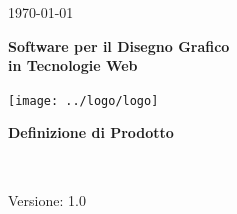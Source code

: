 \usepackage{multirow}

\title{\TITOLODOC}
\author{Stefano Dissegna}



\renewcommand{\insertversion}{1.0} %
\renewcommand{\TITOLODOC}{Definizione di Prodotto} %
\renewcommand{\glosspath}{.\glossario} %

\begin{titlepage}
\begin{center}
	\begin{Large}	\today \end{Large}
\end{center}

\vspace{20pt}

\begin{center}
	\begin{Huge}
				\textbf{\ajax}
	\end{Huge}
\end{center}			

\begin{center}
	\begin{large}
				\textbf{Software per il Disegno Grafico\\ in Tecnologie Web}
	\end{large}
\end{center}			

\vspace{20pt}

\begin{center}
\texttt{[image: ../logo/logo]}
\end{center}

\vspace{170pt}
\begin{center} %
	\begin{Huge}
				\textbf{\TITOLODOC}
	\end{Huge}
			\\
\end{center}
\vspace{190pt}
\begin{center}
Versione: \insertversion
\end{center}
\end{titlepage}

